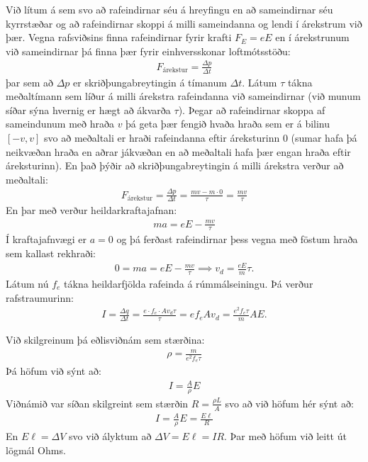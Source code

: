 \ifdefined \wholebook \else\documentclass[oneside]{book}\usepackage{EdlBook}\graphicspath{{figures/}}
\begin{document}
Við lítum á sem svo að rafeindirnar séu á hreyfingu en að sameindirnar séu kyrrstæðar og að rafeindirnar skoppi á milli sameindanna og lendi í árekstrum við þær. Vegna rafsviðsins finna rafeindirnar fyrir krafti $F_E = eE$ en í árekstrunum við sameindirnar þá finna þær fyrir einhversskonar loftmótsstöðu:
\begin{align*}
    F_{\text{árekstur}} = \frac{\Delta p}{\Delta t}
\end{align*}
þar sem að $\Delta p$ er skriðþungabreytingin á tímanum $\Delta t$. Látum $\tau$ tákna meðaltímann sem líður á milli árekstra rafeindanna við sameindirnar (við munum síðar sýna hvernig er hægt að ákvarða $\tau$). Þegar að rafeindirnar skoppa af sameindunum með hraða $v$ þá geta þær fengið hvaða hraða sem er á bilinu $[-v,v]$ svo að meðaltali er hraði rafeindanna eftir áreksturinn $0$ (sumar hafa þá neikvæðan hraða en aðrar jákvæðan en að meðaltali hafa þær engan hraða eftir áreksturinn). En það þýðir að skriðþungabreytingin á milli 
árekstra verður að meðaltali:
\begin{align*}
    F_{\text{árekstur}} = \frac{\Delta p}{\Delta t} = \frac{mv - m \cdot 0}{\tau} = \frac{mv}{\tau}
\end{align*}
En þar með verður heildarkraftajafnan:
\begin{align*}
    ma = eE - \frac{mv}{\tau}
\end{align*}
Í kraftajafnvægi er $a = 0$ og þá ferðast rafeindirnar þess vegna með föstum hraða sem kallast rekhraði:
\begin{align*}
    0 = ma = eE - \frac{mv}{\tau} \implies v_d = \frac{eE}{m}\tau.
\end{align*}
Látum nú $f_e$ tákna heildarfjölda rafeinda á rúmmálseiningu. Þá verður rafstraumurinn:
\begin{align*}
    I = \frac{\Delta q}{\Delta t} = \frac{e \cdot f_e \cdot A v_d \tau}{\tau} = e f_e A v_d = \frac{e^2 f_e \tau}{m} A E.
\end{align*}

Við skilgreinum þá eðlisviðnám sem stærðina:
\begin{align*}
    \rho = \frac{m}{e^2 f_e \tau}
\end{align*}
Þá höfum við sýnt að:
\begin{align*}
    I = \frac{A}{\rho} E
\end{align*}
Viðnámið var síðan skilgreint sem stærðin $R = \frac{\rho L}{A}$ svo að við höfum hér sýnt að:
\begin{align*}
    I = \frac{A }{\rho} E = \frac{E \ell}{R}
\end{align*}
En $E \ell = \Delta V$ svo við ályktum að $\Delta V = E \ell = IR$. Þar með höfum við leitt út lögmál Ohms. \\
\end{document}
